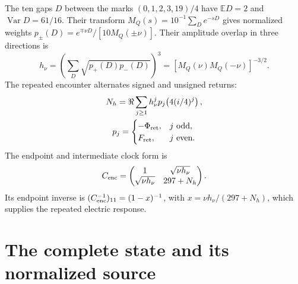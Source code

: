 \documentclass[aps,prx,reprint,longbibliography]{revtex4-2}
\providecommand{\Phis}{\Phi_{\rm ret}}
\providecommand{\Var}{\operatorname{Var}}
\providecommand{\E}{\mathbb E}
\providecommand{\Fret}{F_{\rm ret}}
\providecommand{\hnu}{h_\nu}
\begin{document}
The ten gaps $D$ between the marks $(0,1,2,3,19)/4$ have $\E D=2$ and $\Var D=61/16$. Their transform $M_Q(s)=10^{-1}\sum_D e^{-sD}$ gives normalized weights $p_\pm(D)=e^{\mp\nu D}/[10M_Q(\pm\nu)]$. Their amplitude overlap in three directions is
\begin{equation}
 \hnu=\left(\sum_D\sqrt{p_+(D)p_-(D)}\right)^3
 =[M_Q(\nu)M_Q(-\nu)]^{-3/2}.
 \label{ap:clockoverlap}
\end{equation}
The repeated encounter alternates signed and unsigned returns:
\begin{equation}
 \begin{gathered}
 N_h=\Re\sum_{j\geq1}\hnu^j p_j\!\left(4(i/4)^j\right),\\
 p_j=\begin{cases}-\Phis,&j\text{ odd},\\\Fret,&j\text{ even}.
 \end{cases}
 \end{gathered}
 \label{ap:repeatedreturn}
\end{equation}
The endpoint and intermediate clock form is
\begin{equation}
 C_{\rm enc}=\begin{pmatrix}
 1&\sqrt{\nu\hnu}\\
 \sqrt{\nu\hnu}&297+N_h
 \end{pmatrix}.
 \label{ap:electricclock}
\end{equation}
Its endpoint inverse is $(C_{\rm enc}^{-1})_{11}=(1-x)^{-1}$, with $x=\nu\hnu/(297+N_h)$, which supplies the repeated electric response.

\section{The complete state and its normalized source}
\label{app:source}
\end{document}

